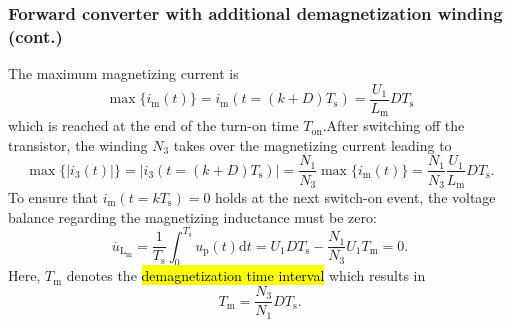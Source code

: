 \begin{frame}
    \frametitle{Forward converter with additional demagnetization winding (cont.)}
    The maximum magnetizing current is
    \begin{equation}
        \max\{i_\mathrm{m}(t)\} = i_\mathrm{m}(t=(k+D)T_\mathrm{s}) = \frac{U_1}{L_\mathrm{m}}DT_\mathrm{s}
    \end{equation}
    which is reached at the end of the turn-on time $T_\mathrm{on}$.\pause After switching off the transistor, the winding $N_3$ takes over the magnetizing current leading to
    \begin{equation}
        \max\{|i_\mathrm{3}(t)|\} = |i_3(t=(k+D)T_\mathrm{s})| = \frac{N_1}{N_3}\max\{i_\mathrm{m}(t)\} = \frac{N_1}{N_3}\frac{U_1}{L_\mathrm{m}}DT_\mathrm{s}.
    \end{equation}\pause
    To ensure that $i_\mathrm{m}(t=kT_\mathrm{s})=0$ holds at the next switch-on event, the voltage balance regarding the magnetizing inductance must be zero:
    \begin{equation}
        \overline{u}_\mathrm{L_\mathrm{m}} = \frac{1}{T_\mathrm{s}}\int_{0}^{T_\mathrm{s}}u_\mathrm{p}(t)\mathrm{d}t = U_1 D T_\mathrm{s} - \frac{N_1}{N_3} U_1  T_\mathrm{m} =0 .
    \end{equation}\pause
    Here, $T_\mathrm{m}$ denotes the \hl{demagnetization time interval} which results in 
    \begin{equation}
        T_\mathrm{m} = \frac{N_3}{N_1}DT_\mathrm{s}.
        \label{eq:forward_converter_demagnetization_time_interval}
    \end{equation}
\end{frame}

